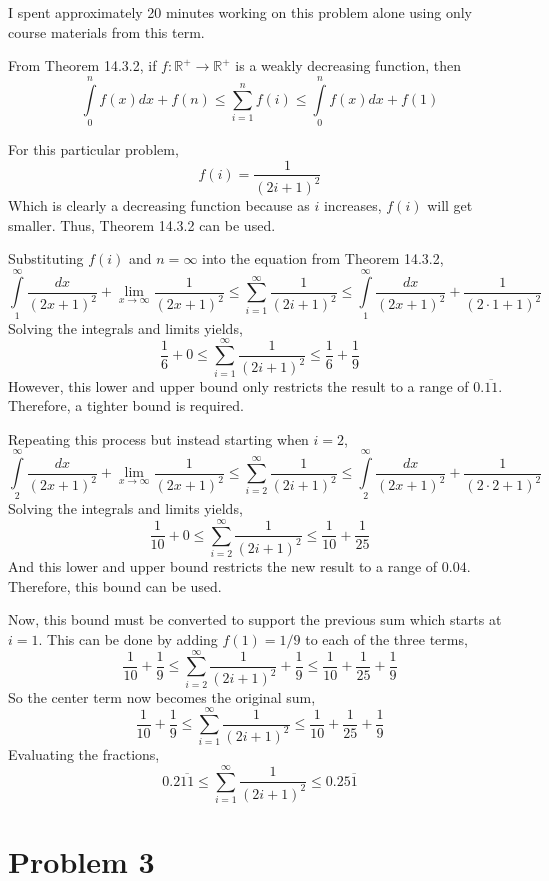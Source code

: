 \documentclass{article}
\begin{document}
I spent approximately 20 minutes working on this problem alone using only course
materials from this term.

\bigbreak

From Theorem 14.3.2, if $f: \mathbb{R}^+ \rightarrow \mathbb{R}^+$ is a weakly
decreasing function, then
$$ \int\limits_0^n f(x) dx + f(n) \leq \sum\limits_{i=1}^{n} f(i) \leq
\int\limits_0^n f(x) dx + f(1) $$

For this particular problem,
$$ f(i) = \frac{1}{(2i + 1)^2} $$
Which is clearly a decreasing function because as $i$ increases, $f(i)$ will get
smaller. Thus, Theorem 14.3.2 can be used.

Substituting $f(i)$ and $n = \infty$ into the equation from Theorem 14.3.2,
$$ \int\limits_1^\infty \frac{dx}{(2x + 1)^2} + \lim_{x \to \infty} \frac{1}{(2x
+ 1)^2} \leq \sum\limits_{i=1}^{\infty} \frac{1}{(2i + 1)^2} \leq
\int\limits_1^\infty \frac{dx}{(2x + 1)^2} + \frac{1}{(2 \cdot 1 + 1)^2} $$
Solving the integrals and limits yields,
$$ \frac{1}{6} + 0 \leq \sum\limits_{i=1}^{\infty} \frac{1}{(2i + 1)^2} \leq
\frac{1}{6} + \frac{1}{9} $$
However, this lower and upper bound only restricts the result to a range of
$0.\overline{11}$. Therefore, a tighter bound is required.

Repeating this process but instead starting when $i = 2$,
$$ \int\limits_2^\infty \frac{dx}{(2x + 1)^2} + \lim_{x \to \infty} \frac{1}{(2x
+ 1)^2} \leq \sum\limits_{i=2}^{\infty} \frac{1}{(2i + 1)^2} \leq
\int\limits_2^\infty \frac{dx}{(2x + 1)^2} + \frac{1}{(2 \cdot 2 + 1)^2} $$
Solving the integrals and limits yields,
$$ \frac{1}{10} + 0 \leq \sum\limits_{i=2}^{\infty} \frac{1}{(2i + 1)^2} \leq
\frac{1}{10} + \frac{1}{25} $$
And this lower and upper bound restricts the new result to a range of $0.04$.
Therefore, this bound can be used.

Now, this bound must be converted to support the previous sum which starts at $i
= 1$. This can be done by adding $f(1) = 1/9$ to each of the three terms,
$$ \frac{1}{10} + \frac{1}{9} \leq \sum\limits_{i=2}^{\infty} \frac{1}{(2i +
1)^2} + \frac{1}{9} \leq \frac{1}{10} + \frac{1}{25} + \frac{1}{9} $$
So the center term now becomes the original sum,
$$ \frac{1}{10} + \frac{1}{9} \leq \sum\limits_{i=1}^{\infty} \frac{1}{(2i +
1)^2} \leq \frac{1}{10} + \frac{1}{25} + \frac{1}{9} $$
Evaluating the fractions,
$$ 0.2\overline{11} \leq \sum\limits_{i=1}^{\infty} \frac{1}{(2i + 1)^2} \leq
0.25\overline{1} $$

\break

\section*{Problem 3}
\end{document}

